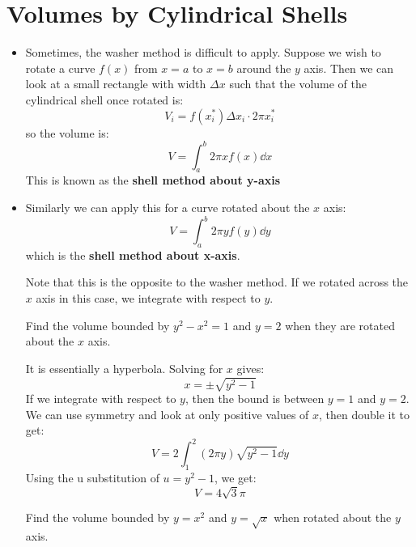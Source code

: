 \section{Volumes by Cylindrical Shells}
\begin{itemize}
    \item Sometimes, the washer method is difficult to apply. Suppose we wish to rotate a curve $f(x)$ from $x=a$ to $x=b$ around the $y$ axis. Then we can look at a small rectangle with width $\Delta x$ such that the volume of the cylindrical shell once rotated is:
    \begin{equation}
        V_i = f(x_i^*)\Delta x_i \cdot 2\pi x_i^*
        \label{eq:}
    \end{equation}
     so the volume is:
     \begin{equation}
         V = \int_a^b 2\pi x f(x) \dd{x}
         \label{eq:}
     \end{equation}
    This is known as the \textbf{shell method about y-axis}
    \item Similarly we can apply this for a curve rotated about the $x$ axis:
    \begin{equation}
        V = \int_a^b 2\pi y f(y) \dd{y}
        \label{eq:}
    \end{equation}
    which is the \textbf{shell method about x-axis}.
    \begin{warning}
        Note that this is the opposite to the washer method. If we rotated across the $x$ axis in this case, we integrate with respect to $y$.
    \end{warning}
    \begin{example}
        Find the volume bounded by $y^2-x^2=1$ and $y=2$ when they are rotated about the $x$ axis.
        \vspace{2mm}

        It is essentially a hyperbola. Solving for $x$ gives:
        \begin{equation}
            x = \pm \sqrt{y^2-1}
            \label{eq:}
        \end{equation}
        If we integrate with respect to $y$, then the bound is between $y=1$ and $y=2$. We can use symmetry and look at only positive values of $x$, then double it to get:
        \begin{equation}
            V = 2\int_1^2 (2\pi y)\sqrt{y^2-1} \dd{y}
            \label{eq:}
        \end{equation}
        Using the u substitution of $u=y^2-1$, we get:
        \begin{equation}
            V = 4\sqrt{3}\pi
            \label{eq:}
        \end{equation}
    \end{example}
    \begin{example}
        Find the volume bounded by $y=x^2$ and $y=\sqrt{x}$ when rotated about the $y$ axis.
        \vspace{2mm}


\end{example}
\end{itemize}

